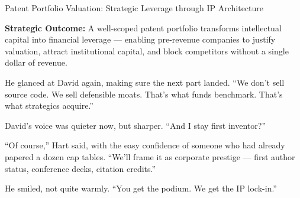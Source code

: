 \begin{TechnicalSidebar}{Patent Portfolio Valuation: Strategic Leverage through IP Architecture}
    \medskip
    
    
    \textbf{Strategic Outcome:}  
    A well-scoped patent portfolio transforms intellectual capital into financial leverage — enabling 
    pre-revenue companies to justify valuation, attract institutional capital, and block competitors 
    without a single dollar of revenue.
    
\end{TechnicalSidebar}

\medskip

He glanced at David again, making sure the next part landed. ``We don’t sell source code. We sell 
defensible moats. That’s what funds benchmark. That’s what strategics acquire.''

David’s voice was quieter now, but sharper. ``And I stay first inventor?''

``Of course,'' Hart said, with the easy confidence of someone who had already papered a dozen cap 
tables. ``We’ll frame it as corporate prestige — first author status, conference decks, citation 
credits.''

He smiled, not quite warmly. ``You get the podium. We get the IP lock-in.''

\medskip

